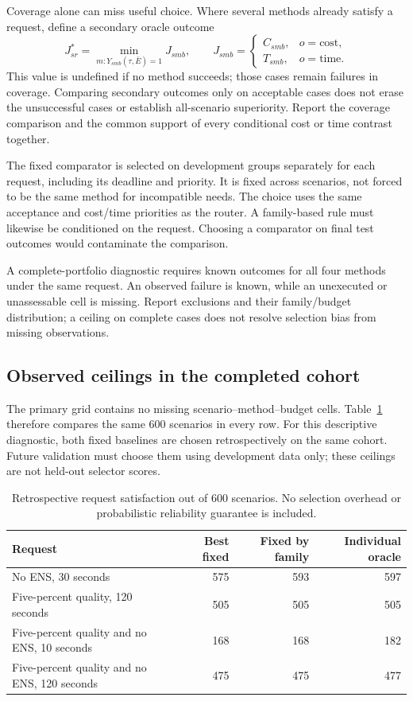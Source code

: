 Coverage alone can miss useful choice. Where several methods already satisfy
a request, define a secondary oracle outcome
\begin{equation}
 J^*_{sr}=\min_{m:Y_{smb}(\tau,\bar E)=1}J_{smb},
 \qquad
 J_{smb}=
 \begin{cases}
 C_{smb},&o=\text{cost},\\
 T_{smb},&o=\text{time}.
 \end{cases}
\end{equation}
This value is undefined if no method succeeds; those cases remain failures
in coverage. Comparing secondary outcomes only on acceptable cases does not
erase the unsuccessful cases or establish all-scenario superiority. Report
the coverage comparison and the common support of every conditional cost or
time contrast together.

The fixed comparator is selected on development groups separately for each
request, including its deadline and priority. It is fixed across scenarios,
not forced to be the same method for incompatible needs. The choice uses the
same acceptance and cost/time priorities as the router. A family-based rule
must likewise be conditioned on the request. Choosing a comparator on final
test outcomes would contaminate the comparison.

A complete-portfolio diagnostic requires known outcomes for all four methods
under the same request. An observed failure is known, while an unexecuted or
unassessable cell is missing. Report exclusions and their family/budget
distribution; a ceiling on complete cases does not resolve selection bias
from missing observations.

\subsection{Observed ceilings in the completed cohort}
The primary grid contains no missing scenario--method--budget cells.
Table~\ref{tab:final_oracles} therefore compares the same 600 scenarios in every
row. For this descriptive diagnostic, both fixed baselines are chosen
retrospectively on the same cohort. Future validation must choose them using
development data only; these ceilings are not held-out selector scores.

\begin{table}[htbp]\centering\small
\caption{Retrospective request satisfaction out of 600 scenarios. No selection
overhead or probabilistic reliability guarantee is included.}
\label{tab:final_oracles}
\begin{tabular}{p{.39\linewidth}rrr}\toprule
Request & Best fixed & Fixed by family & Individual oracle\\\midrule
No ENS, 30 seconds & 575 & 593 & 597\\
Five-percent quality, 120 seconds & 505 & 505 & 505\\
Five-percent quality and no ENS, 10 seconds & 168 & 168 & 182\\
Five-percent quality and no ENS, 120 seconds & 475 & 475 & 477\\\bottomrule
\end{tabular}
\end{table}

